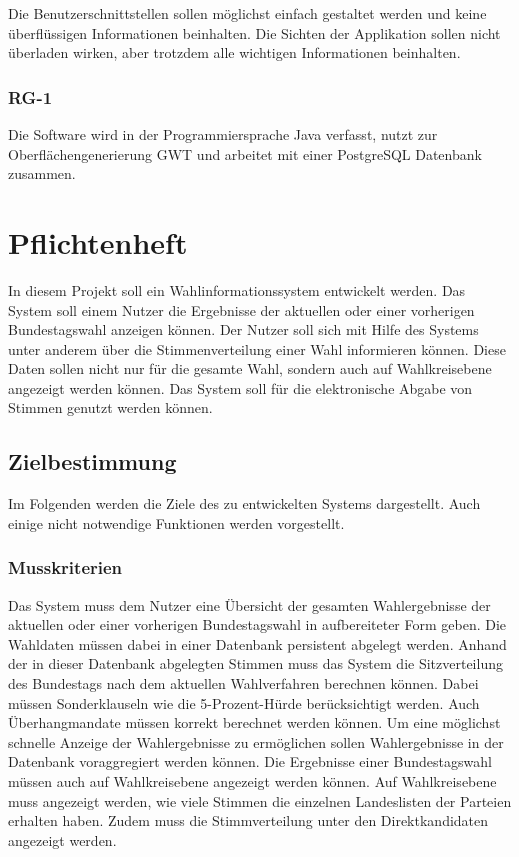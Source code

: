 \documentclass[a4paper]{scrreprt}
\begin{document}
Die Benutzerschnittstellen sollen möglichst einfach gestaltet werden und keine überflüssigen Informationen beinhalten. Die Sichten der Applikation sollen nicht überladen wirken, aber trotzdem alle wichtigen Informationen beinhalten.

\subsection{RG-1}

Die Software wird in der Programmiersprache Java verfasst, nutzt zur Oberflächengenerierung GWT und arbeitet mit einer PostgreSQL Datenbank zusammen.
 
 

\chapter{Pflichtenheft}

In diesem Projekt soll ein Wahlinformationssystem entwickelt werden. Das System soll einem Nutzer die Ergebnisse der aktuellen oder einer vorherigen Bundestagswahl anzeigen können. Der Nutzer soll sich mit Hilfe des Systems unter anderem über die Stimmenverteilung einer Wahl informieren können. Diese Daten sollen nicht nur für die gesamte Wahl, sondern auch auf Wahlkreisebene angezeigt werden können. Das System soll für die elektronische Abgabe von Stimmen genutzt werden können. 

\section{Zielbestimmung}

Im Folgenden werden die Ziele des zu entwickelten Systems dargestellt. Auch einige nicht notwendige Funktionen werden vorgestellt.
 
\subsection{Musskriterien}

Das System muss dem Nutzer eine Übersicht der gesamten Wahlergebnisse der aktuellen oder einer vorherigen Bundestagswahl in aufbereiteter Form geben. Die Wahldaten müssen dabei in einer Datenbank persistent abgelegt werden. Anhand der in dieser Datenbank abgelegten Stimmen muss das System die Sitzverteilung des Bundestags nach dem aktuellen Wahlverfahren berechnen können. Dabei müssen Sonderklauseln wie die 5-Prozent-Hürde berücksichtigt werden. Auch Überhangmandate müssen korrekt berechnet werden können. Um eine möglichst schnelle Anzeige der Wahlergebnisse zu ermöglichen sollen Wahlergebnisse in der Datenbank voraggregiert werden können. Die Ergebnisse einer Bundestagswahl müssen auch auf Wahlkreisebene angezeigt werden können. Auf Wahlkreisebene muss angezeigt werden, wie viele Stimmen die einzelnen Landeslisten der Parteien erhalten haben. Zudem muss die Stimmverteilung unter den Direktkandidaten angezeigt werden. 
\end{document}
